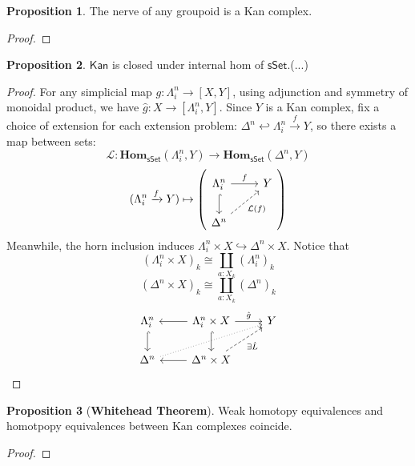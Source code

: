 \documentclass{article}
\theoremstyle{definition}
\newtheorem{prop}{Proposition}[section]
\theoremstyle{remark}
\begin{document}
\begin{prop}
The nerve of any groupoid is a Kan complex.
\end{prop}

\begin{proof}

\end{proof}

\begin{prop}
$\mathsf{Kan}$ is closed under internal hom of $\mathsf{sSet}$.(...)
\end{prop}

\begin{proof}

For any simplicial map $g: \Lambda^n_i \to [X,Y]$, using adjunction and symmetry of monoidal product, we have $\hat{g}: X \to [\Lambda^n_i,Y]$. Since $Y$ is a Kan complex, fix a choice of extension for each extension problem: $\Delta^n \hookleftarrow \Lambda^n_i \xrightarrow{f} Y$, so there exists a map between sets: $$\mathcal{L}:\mathbf{Hom}_{\mathsf{sSet}}(\Lambda^n_i,Y) \to \mathbf{Hom}_{\mathsf{sSet}}(\Delta^n,Y)$$    $$ (\Lambda^n_i \xrightarrow{f} Y) \mapsto \left( \begin{tikzcd} \Lambda^n_i \arrow[d, hook] \arrow[r,"f"] & Y \\ \Delta^n \arrow[ru, "\mathcal{L}(f)"', dashed] \end{tikzcd} \right) $$ Meanwhile, the horn inclusion induces $\Lambda^n_i \times X \hookrightarrow \Delta^n \times X$. Notice that $$ (\Lambda^n_i \times X)_k \cong \coprod_{a:X_k}{(\Lambda^n_i)_k}$$    $$ (\Delta^n \times X)_k \cong \coprod_{a:X_k}{(\Delta^n)_k}$$
$$ \begin{tikzcd} \Lambda^n_i \arrow[d, hook]  & \Lambda^n_i \times X \arrow[d, hook] \arrow[r, "\hat{g}"] \arrow[l] & Y \\ \Delta^n \arrow[rru, dotted] & \Delta^n \times X \arrow[ru, "\exists \hat{L}"', dashed] \arrow[l]  & \end{tikzcd} $$

\end{proof}


\begin{prop}[\textbf{Whitehead Theorem}]
Weak homotopy equivalences and homotpopy equivalences between Kan complexes coincide.
\end{prop}

\begin{proof}

\end{proof}
\end{document}
